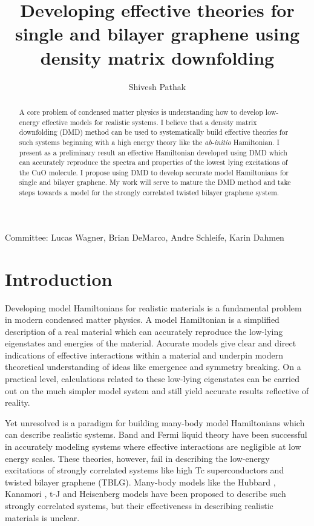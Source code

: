 \documentclass[12pt]{article}
\author{Shivesh Pathak}
\title{Developing effective theories for single and bilayer graphene using density matrix downfolding}
\begin{document}
\maketitle
\begin{abstract}
A core problem of condensed matter physics is understanding how to develop low-energy effective models for realistic systems.
I believe that a density matrix downfolding (DMD) method \cite{Zheng2017} can be used to systematically build effective theories for such systems beginning with a high energy theory like the \textit{ab-initio} Hamiltonian.
I present as a preliminary result an effective Hamiltonian developed using DMD which can accurately reproduce the spectra and properties of the lowest lying excitations of the CuO molecule.
I propose using DMD to develop accurate model Hamiltonians for single and bilayer graphene.
My work will serve to mature the DMD method and take steps towards a model for the strongly correlated twisted bilayer graphene system.
\end{abstract}
Committee: Lucas Wagner, Brian DeMarco, Andre Schleife, Karin Dahmen
\pagebreak

\section{Introduction}
Developing model Hamiltonians for realistic materials is a fundamental problem in modern condensed matter physics.
A model Hamiltonian is a simplified description of a real material which can accurately reproduce the low-lying eigenstates and energies of the material.
Accurate models give clear and direct indications of effective interactions within a material and underpin modern theoretical understanding of ideas like emergence and symmetry breaking.
On a practical level, calculations related to these low-lying eigenstates can be carried out on the much simpler model system and still yield accurate results reflective of reality.

Yet unresolved is a paradigm for building many-body model Hamiltonians which can describe realistic systems.
Band and Fermi liquid theory have been successful in accurately modeling systems where effective interactions are negligible at low energy scales.
These theories, however, fail in describing the low-energy excitations of strongly correlated systems like high Tc superconductors and twisted bilayer graphene (TBLG).
Many-body models like the Hubbard \cite{Hubbard1963}, Kanamori \cite{10.1143/PTP.30.275}, t-J \cite{Chao_1977} and Heisenberg models have been proposed to describe such strongly correlated systems, but their effectiveness in describing realistic materials is unclear.
\end{document}

